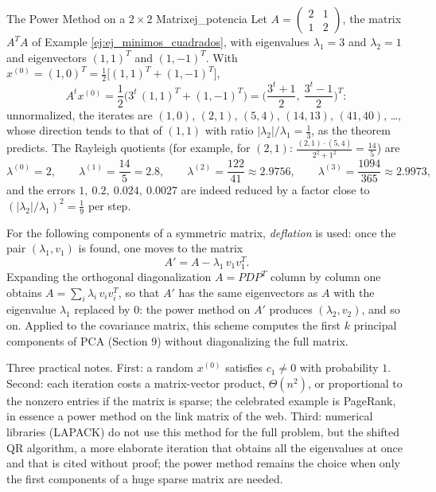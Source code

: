 \documentclass[11pt, a4paper]{article}
\begin{document}
\begin{ejemplo}{The Power Method on a $2 \times 2$ Matrix}{ej_potencia}
Let $A = \begin{pmatrix} 2 & 1 \\ 1 & 2 \end{pmatrix}$, the matrix $A^T A$ of Example \ref{ej:ej_minimos_cuadrados}, with eigenvalues $\lambda_1 = 3$ and $\lambda_2 = 1$ and eigenvectors $(1, 1)^T$ and $(1, -1)^T$. With $x^{(0)} = (1, 0)^T = \frac{1}{2} \big[ (1,1)^T + (1,-1)^T \big]$,
\[
A^t x^{(0)} = \frac{1}{2} \Big( 3^t \, (1, 1)^T + (1, -1)^T \Big) = \Big( \frac{3^t + 1}{2}, \ \frac{3^t - 1}{2} \Big)^{T}:
\]
unnormalized, the iterates are $(1,0)$, $(2,1)$, $(5,4)$, $(14,13)$, $(41,40)$, \dots, whose direction tends to that of $(1,1)$ with ratio $|\lambda_2| / \lambda_1 = \frac{1}{3}$, as the theorem predicts. The Rayleigh quotients (for example, for $(2,1)$: $\frac{(2,1) \cdot (5,4)}{2^2 + 1^2} = \frac{14}{5}$) are
\[
\lambda^{(0)} = 2, \qquad \lambda^{(1)} = \frac{14}{5} = 2.8, \qquad \lambda^{(2)} = \frac{122}{41} \approx 2.9756, \qquad \lambda^{(3)} = \frac{1094}{365} \approx 2.9973,
\]
and the errors $1, \ 0.2, \ 0.024, \ 0.0027$ are indeed reduced by a factor close to $(|\lambda_2| / \lambda_1)^2 = \frac{1}{9}$ per step.
\end{ejemplo}

\obs For the following components of a symmetric matrix, \emph{deflation} is used: once the pair $(\lambda_1, v_1)$ is found, one moves to the matrix
\[
A' = A - \lambda_1 \, v_1 v_1^T.
\]
Expanding the orthogonal diagonalization $A = P D P^T$ column by column one obtains $A = \sum_i \lambda_i \, v_i v_i^T$, so that $A'$ has the same eigenvectors as $A$ with the eigenvalue $\lambda_1$ replaced by $0$: the power method on $A'$ produces $(\lambda_2, v_2)$, and so on. Applied to the covariance matrix, this scheme computes the first $k$ principal components of PCA (Section 9) without diagonalizing the full matrix.

\obs Three practical notes. First: a random $x^{(0)}$ satisfies $c_1 \neq 0$ with probability $1$. Second: each iteration costs a matrix-vector product, $\Theta(n^2)$, or proportional to the nonzero entries if the matrix is sparse; the celebrated example is PageRank, in essence a power method on the link matrix of the web. Third: numerical libraries (LAPACK) do not use this method for the full problem, but the shifted QR algorithm, a more elaborate iteration that obtains all the eigenvalues at once and that is cited without proof; the power method remains the choice when only the first components of a huge sparse matrix are needed.
\end{document}
